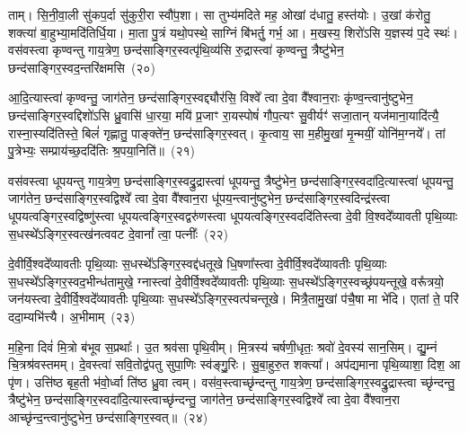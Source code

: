 ताम्। सि॒नी॒वा॒ली सु॑कप॒र्दा सु॑कुरी॒रा स्वौ॑प॒शा। सा तुभ्य॑मदिते मह॒ ओखां द॑धातु॒ हस्त॑योः। उ॒खां क॑रोतु॒ शक्त्या॑ बा॒हुभ्या॒मदि॑तिर्धि॒या। मा॒ता पु॒त्रं यथो॒पस्थे॒ साग्निं बि॑भर्तु॒ गर्भ॒ आ। म॒खस्य॒ शिरो॑\-ऽसि य॒ज्ञस्य॑ प॒दे स्थः॑। वस॑वस्त्वा कृण्वन्तु गाय॒त्रेण॒ छन्द॑साङ्गिर॒स्वत्पृ॑थि॒व्य॑सि रु॒द्रास्त्वा॑ कृण्वन्तु॒ त्रैष्टु॑भेन॒ छन्द॑साङ्गिर॒स्वद॒न्तरि॑क्षमसि~(२०)

आ॒दि॒त्यास्त्वा॑ कृण्वन्तु॒ जाग॑तेन॒ छन्द॑साङ्गिर॒स्वद्द्यौर॑सि॒ विश्वे᳚ त्वा दे॒वा वै᳚श्वान॒राः कृ॑ण्व॒न्त्वानु॑ष्टुभेन॒ छन्द॑साङ्गिर॒स्वद्दिशो॑\-ऽसि ध्रु॒वासि॑ धा॒रया॒ मयि॑ प्र॒जाꣳ रा॒यस्पोषं॑ गौप॒त्यꣳ सु॒वीर्यꣳ॑ सजा॒तान् यज॑माना॒यादि॑त्यै॒ रास्ना॒स्यदि॑तिस्ते॒ बिलं॑ गृह्णातु॒ पाङ्क्ते॑न॒ छन्द॑साङ्गिर॒स्वत्। कृ॒त्वाय॒ सा म॒हीमु॒खां मृ॒न्मयीं॒ योनि॑म॒ग्नये᳚। तां पु॒त्रेभ्यः॒ सम्प्राय॑च्छ॒ददि॑तिः श्र॒पया॒निति॑॥~(२१)

{\anuvakamend[{मि॒त्रः क॑रोत्व॒न्तरि॑क्षमसि॒ प्र च॒त्वारि॑ च}]}%

वस॑वस्त्वा धूपयन्तु गाय॒त्रेण॒ छन्द॑साङ्गिर॒स्वद्रु॒द्रास्त्वा॑ धूपयन्तु॒ त्रैष्टु॑भेन॒ छन्द॑साङ्गिर॒स्वदा॑दि॒त्यास्त्वा॑ धूपयन्तु॒ जाग॑तेन॒ छन्द॑साङ्गिर॒स्वद्विश्वे᳚ त्वा दे॒वा वै᳚श्वान॒रा धू॑पय॒न्त्वानु॑ष्टुभेन॒ छन्द॑साङ्गिर॒स्वदिन्द्र॑स्त्वा धूपयत्वङ्गिर॒स्वद्विष्णु॑स्त्वा धूपयत्वङ्गिर॒स्वद्वरु॑णस्त्वा धूपयत्वङ्गिर॒स्वददि॑तिस्त्वा दे॒वी वि॒श्वदे᳚व्यावती पृथि॒व्याः स॒धस्थे᳚\-ऽङ्गिर॒स्वत्ख॑नत्ववट दे॒वानां᳚ त्वा॒ पत्नीः᳚~(२२)

दे॒वीर्वि॒श्वदे᳚व्यावतीः पृथि॒व्याः स॒धस्थे᳚\-ऽङ्गिर॒स्वद्द॑धतूखे धि॒षणा᳚स्त्वा दे॒वीर्वि॒श्वदे᳚व्यावतीः पृथि॒व्याः स॒धस्थे᳚\-ऽङ्गिर॒स्वद॒भीन्ध॑तामुखे॒ ग्नास्त्वा॑ दे॒वीर्वि॒श्वदे᳚व्यावतीः पृथि॒व्याः स॒धस्थे᳚\-ऽङ्गिर॒स्वच्छ्र॑पयन्तूखे॒ वरू᳚त्रयो॒ जन॑यस्त्वा दे॒वीर्वि॒श्वदे᳚व्यावतीः पृथि॒व्याः स॒धस्थे᳚\-ऽङ्गिर॒स्वत्प॑चन्तूखे। मित्रै॒तामु॒खां प॑चै॒षा मा भे॑दि। एातां ते॒ परि॑ ददा॒म्यभि॑त्त्यै। अ॒भीमाम्~(२३)

म॒हि॒ना दिवं॑ मि॒त्रो ब॑भूव स॒प्रथाः᳚। उ॒त श्रव॑सा पृथि॒वीम्। मि॒त्रस्य॑ चर्\mbox{}षणी॒धृतः॒ श्रवो॑ दे॒वस्य॑ सान॒सिम्। द्यु॒म्नं चि॒त्रश्र॑वस्तमम्। दे॒वस्त्वा॑ सवि॒तोद्व॑पतु सुपा॒णिः स्व॑ङ्गु॒॒रिः। सु॒बा॒हुरु॒त शक्त्या᳚। अप॑द्यमाना पृथि॒व्याशा॒ दिश॒ आ पृ॑ण। उत्ति॑ष्ठ बृह॒ती भ॑वो॒र्ध्वा ति॑ष्ठ ध्रु॒वा त्वम्। वस॑व॒स्त्वाच्छृ॑न्दन्तु गाय॒त्रेण॒ छन्द॑साङ्गिर॒स्वद्रु॒द्रास्त्वा च्छृ॑न्दन्तु॒ त्रैष्टु॑भेन॒ छन्द॑साङ्गिर॒स्वदा॑दि॒त्यास्त्वाच्छृ॑न्दन्तु॒ जाग॑तेन॒ छन्द॑साङ्गिर॒स्वद्विश्वे᳚ त्वा दे॒वा वै᳚श्वान॒रा आच्छृ॑न्द॒न्त्वानु॑ष्टुभेन॒ छन्द॑साङ्गिर॒स्वत्॥~(२४)

{\anuvakamend[{पत्नी॑रि॒माꣳ रु॒द्रास्त्वाच्छृ॑न्द॒न्त्वेका॒न्नविꣳ॑श॒तिश्च॑}]}%

